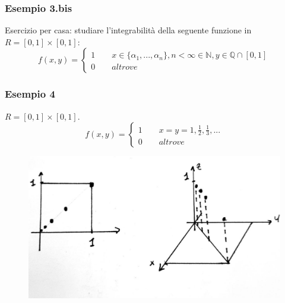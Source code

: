 \documentclass[10pt]{article}
\theoremstyle{plain}
\theoremstyle{definition}
\begin{document}
 
\subsubsection{Esempio 3.bis}
Esercizio per casa: studiare l'integrabilità della seguente funzione in
$R=[0,1]\times [0,1]$:
\begin{equation}
  f(x,y)=
   \begin{cases}
   1\qquad x\in \{ \alpha_1,...,\alpha_n\}, n<\infty \in \mathbb{N}, y \in \mathbb{Q}\cap [0,1]\\0 \qquad altrove
   \end{cases}
\end{equation}

\subsubsection{Esempio 4}
$R=[0,1]\times [0,1]$.
\begin{equation}
  f(x,y)=
   \begin{cases}
   1\qquad x=y=1,\frac{1}{2},\frac{1}{3}, ...\\0 \qquad altrove
   \end{cases}
\end{equation}

\begin{figure}[ht]
\centering
\centerline{\includegraphics[width=93 mm,scale=1]{fig6.jpg}}
\label{fig: }
\end{figure}
\end{document}
